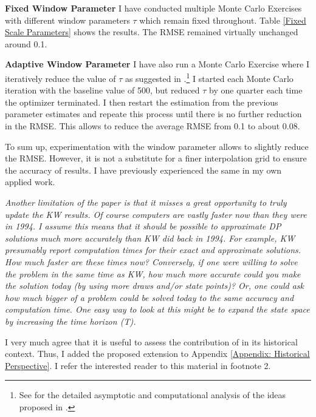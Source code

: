 \begin{boenumerate}
\begin{boenumerate}
\item \textbf{Fixed Window Parameter} I have conducted multiple Monte Carlo Exercises with different window parameters $\tau$ which remain fixed throughout. Table \ref{Fixed Scale Parameters} shows the results. The RMSE remained virtually unchanged around 0.1.



\item \textbf{Adaptive Window Parameter} I have also run a Monte Carlo Exercise where I iteratively reduce the value of $\tau$ as suggested in \citet{Keane.2003}.\footnote{See \citet{Bruins.2015} for the detailed asymptotic and computational analysis of the ideas proposed in \citet{Keane.2003}.} I started each Monte Carlo iteration with the baseline value of 500, but reduced $\tau$ by one quarter each time the optimizer terminated. I then restart the estimation from the previous parameter estimates and repeate this process until there is no further reduction in the RMSE. This allows to reduce the average RMSE from 0.1 to about 0.08.\newline
\end{boenumerate}

To sum up, experimentation with the window parameter allows to slightly reduce the RMSE. However, it is not a substitute for a finer interpolation grid to ensure the accuracy of results. I have previously experienced the same in my own applied work.\newline
\item \textit{Another limitation of the paper is that it misses a great opportunity to truly update the KW results. Of course computers are vastly faster now than they were in 1994. I assume this means that it should be possible to approximate DP solutions much more accurately than KW did back in 1994. For example, KW presumably report computation times for their exact and approximate solutions. How much faster are these times now? Conversely, if one were willing to solve the problem in the same time as KW, how much more accurate could you make the solution today (by using more draws and/or state points)? Or, one could ask how much bigger of a problem could be solved today to the same accuracy and computation time. One easy way to look at this might be to expand the state space by increasing the time horizon (T).}\vspace{0.5cm}

I very much agree that it is useful to assess the contribution of \citet{Keane.1994} in its historical context. Thus, I added the proposed extension to Appendix \ref{Appendix: Historical Perspective}. I refer the interested reader to this material in footnote 2.
\end{boenumerate}
